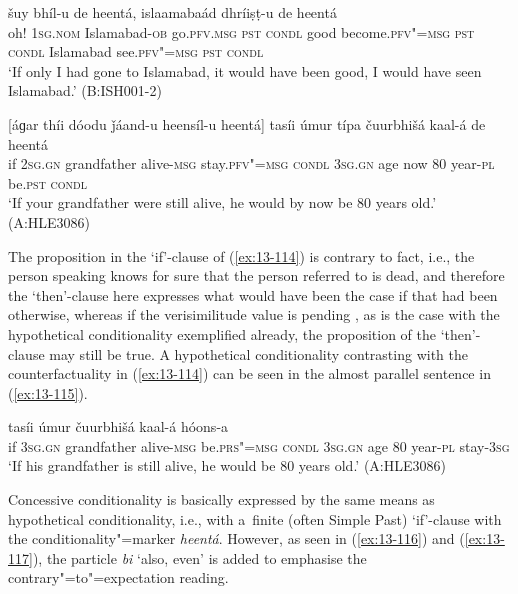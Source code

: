 \begin{exe}
\ex
\label{ex:13-113}
 šuy bhíl-u de heentá,
islaamabaád  dhríiṣṭ-u de heentá \\
oh! \textsc{1sg.nom} Islamabad-\textsc{ob} go.\textsc{pfv.msg} \textsc{pst}  \textsc{condl} good become.\textsc{pfv"=msg} \textsc{pst} \textsc{condl} Islamabad see.\textsc{pfv"=msg} \textsc{pst} \textsc{condl} \\
\glt `If only I had gone to Islamabad, it would have been good, I would have seen Islamabad.' (B:ISH001-2)

\ex
\label{ex:13-114}
\gll \label{bkm:Ref190830564}[áɡar thíi dóodu ǰáand-u heensíl-u  heentá]
tasíi úmur típa čuurbhišá kaal-á de  heentá \\
if \textsc{2sg.gn} grandfather alive-\textsc{msg} stay.\textsc{pfv"=msg}  \textsc{condl} 
\textsc{3sg.gn} age now 80 year-\textsc{pl} be.\textsc{pst} \textsc{condl} \\
\glt `If your grandfather were still alive, he would by now be 80 years old.' (A:HLE3086) 
\end{exe}

The proposition in the `if'-clause of (\ref{ex:13-114}) is contrary to fact, i.e., the person speaking knows for sure that the person referred to is dead, and therefore the `then'-clause here expresses what would have been the case if that had been otherwise, whereas if the verisimilitude value is pending \citep[332]{givon2001b}, as is the case with the hypothetical conditionality exemplified already, the proposition of the `then'-clause may still be true. A hypothetical conditionality contrasting with the counterfactuality in (\ref{ex:13-114}) can be seen in the almost parallel sentence in (\ref{ex:13-115}).

\begin{exe}
\ex
\label{ex:13-115}
 tasíi úmur čuurbhišá kaal-á hóons-a \\
if \textsc{3sg.gn} grandfather alive-\textsc{msg} be.\textsc{prs"=msg}  \textsc{condl} \textsc{3sg.gn} age 80 year-\textsc{pl} stay-\textsc{3sg} \\
\glt `If his grandfather is still alive, he would be 80 years old.' (A:HLE3086) 
\end{exe}

 Concessive conditionality is basically expressed by the same means as hypothetical conditionality, i.e., with a~finite (often Simple Past) `if'-clause with the conditionality"=marker \textit{heentá}. However, as seen in (\ref{ex:13-116}) and (\ref{ex:13-117}), the particle \textit{bi} `also, even' is added to emphasise the contrary"=to"=expectation reading. 

